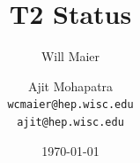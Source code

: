 \documentclass{beamer}
\title{T2 Status}
\author[Maier, Mohapatra]{
    Will Maier \and Ajit Mohapatra\\ 
    {\tt wcmaier@hep.wisc.edu}\\
    {\tt ajit@hep.wisc.edu}}
\institute[Wisconsin]{University of Wisconsin - High Energy Physics}
\date{\today}
\begin{document}
\begin{frame}
    \titlepage
\end{frame}

\end{document}

